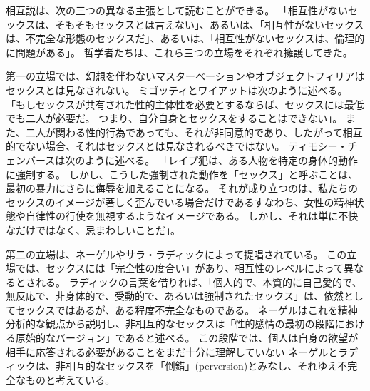 \documentclass[paper=a4,book,openany]{jlreq} \usepackage{mystyle}
\begin{document}
相互説は、次の三つの異なる主張として読むことができる。
「相互性がないセックスは、そもそもセックスとは言えない」、あるいは、「相互性がないセックスは、不完全な形態のセックスだ」、あるいは、「相互性がないセックスは、倫理的に問題がある」。
哲学者たちは、これら三つの立場をそれぞれ擁護してきた。

第一の立場では、幻想を伴わないマスターベーションやオブジェクトフィリアはセックスとは見なされない。
ミゴッティとワイアットは次のように述べる。
「もしセックスが共有された性的主体性を必要とするならば、セックスには最低でも二人が必要だ。
つまり、自分自身とセックスをすることはできない」\citep[p.20]{migotti17:_very_idea_sex_robot}。
また、二人が関わる性的行為であっても、それが非同意的であり、したがって相互的でない場合、それはセックスとは見なされるべきではない。
ティモシー・チェンバースは次のように述べる。
「レイプ犯は、ある人物を特定の身体的動作に強制する。
しかし、こうした強制された動作を「セックス」と呼ぶことは、最初の暴力にさらに侮辱を加えることになる。
それが成り立つのは、私たちのセックスのイメージが著しく歪んでいる場合だけである{\DDASH}すなわち、女性の精神状態や自律性の行使を無視するようなイメージである。
しかし、それは単に不快なだけではなく、忌まわしいことだ」\citep[p.4]{chambers09:_no_you_cant_steal_kiss}。

第二の立場は、ネーゲルやサラ・ラディックによって提唱されている。
この立場では、セックスには「完全性の度合い」があり、相互性のレベルによって異なるとされる\citep[p.89]{ruddick75:_better_sex}。
ラディックの言葉を借りれば、「個人的で、本質的に自己愛的で、無反応で、非身体的で、受動的で、あるいは強制されたセックス」は、依然としてセックスではあるが、ある程度不完全なものである\citep[p. 87]{ruddick75:_better_sex}。
ネーゲルはこれを精神分析的な観点から説明し、非相互的なセックスは「性的感情の最初の段階における原始的なバージョン」であると述べる。
この段階では、個人は自身の欲望が相手に応答される必要があることをまだ十分に理解していない\citep[p.14]{nagel69:_sexual_perver}
ネーゲルとラディックは、非相互的なセックスを「倒錯」(perversion)とみなし、それゆえ不完全なものと考えている。
\end{document}
